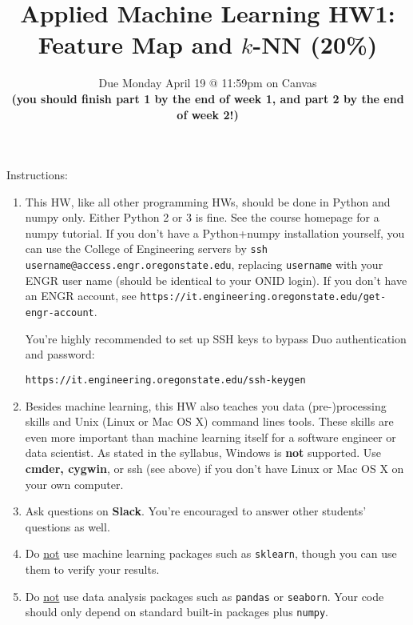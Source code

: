 \documentclass[11pt]{article}
\title{Applied Machine Learning HW1: Feature Map and $k$-NN (20\%)}
\author{Due {Monday April 19} @ 11:59pm on Canvas\\[0.1cm]
{\bf \color{black}(you should finish part 1 by the end of week 1, and part 2 by the end of week 2!)}}
\date{}
\newcommand{\update}[1]{{\bf\color{black} #1}}
\begin{document}
\maketitle

Instructions:
\begin{enumerate}
\item This HW, like all other programming HWs, should be done in Python and numpy only.
Either Python 2 or 3 is fine.
See the course homepage for a numpy tutorial.
If you don't have a Python+numpy installation yourself, you can use the  College of Engineering servers by
\verb|ssh username@access.engr.oregonstate.edu|, replacing \verb|username| with your ENGR user name (should be identical to your ONID login). If you don't have an ENGR account,
see {\tt https://it.engineering.oregonstate.edu/get-engr-account}.

\smallskip

You're highly recommended to set up SSH keys to bypass Duo authentication and password:

{\tt https://it.engineering.oregonstate.edu/ssh-keygen}

\item Besides machine learning, this HW also teaches you data (pre-)processing skills and Unix (Linux or Mac OS X) command lines tools. These skills are even more important than machine learning itself for a software engineer or data scientist. As stated in the syllabus, Windows is {\bf not} supported. Use \update{cmder, cygwin}, or ssh (see above) if you don't have Linux or Mac OS X on your own computer.

\item Ask questions on \update{Slack}. You're encouraged to answer other students' questions as well.

\item Do \underline{not} use machine learning packages such as {\tt sklearn}, though you can use them to verify your results.
\item Do \underline{not} use data analysis packages such as {\tt pandas} or {\tt seaborn}.
Your code should only depend on standard built-in packages plus {\tt numpy}.


\end{enumerate}
\end{document}
